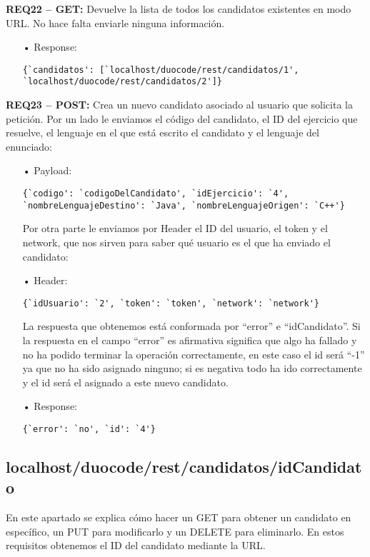 \textbf{REQ22 – GET:} Devuelve la lista de todos los candidatos existentes en modo URL. No hace falta enviarle ninguna información. 
\begin{itemize}
\item[•]
Response: 
{\codesize
\begin{verbatim}
{`candidatos': [`localhost/duocode/rest/candidatos/1', 
`localhost/duocode/rest/candidatos/2']}
\end{verbatim}
}
\end{itemize}

\textbf{REQ23 – POST:} Crea un nuevo candidato asociado al usuario que solicita la petición. Por un lado le enviamos el código del candidato, el ID del ejercicio que resuelve, el lenguaje en el que está escrito el candidato y el lenguaje del enunciado:
\begin{itemize}
\item[•]
Payload: 
{\codesize
\begin{verbatim}
{`codigo': `codigoDelCandidato', `idEjercicio': `4', 
`nombreLenguajeDestino': `Java', `nombreLenguajeOrigen': `C++'}
\end{verbatim}
}

Por otra parte le enviamos por Header el ID del usuario, el token y el network, que nos sirven para saber qué usuario es el que ha enviado el candidato:
\item[•]
Header: 
{\codesize
\begin{verbatim}
{`idUsuario': `2', `token': `token', `network': `network'}
\end{verbatim}
}
La respuesta que obtenemos está conformada por ``error'' e ``idCandidato''. Si la respuesta en el campo ``error'' es afirmativa significa que algo ha fallado y no ha podido terminar la operación correctamente, en este caso el id será ``-1'' ya que no ha sido asignado ninguno; si es negativa todo ha ido correctamente y el id será el asignado a este nuevo candidato. 
\item[•]
Response: 
{\codesize
\begin{verbatim}
{`error': `no', `id': `4'}
\end{verbatim}
}
\end{itemize}

\subsection{localhost/duocode/rest/candidatos/idCandidato}
En este apartado se explica cómo hacer un GET para obtener un candidato en específico, un PUT para modificarlo y un DELETE para eliminarlo.
En estos requisitos obtenemos el ID del candidato mediante la URL.

